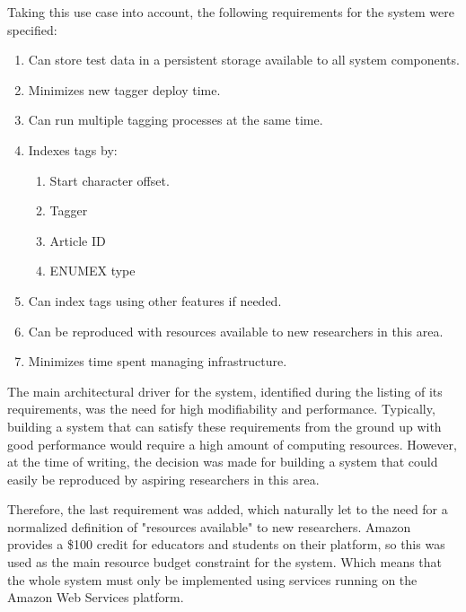 Taking this use case into account, the following requirements for the system were specified:
\begin{enumerate}
\item Can store test data in a persistent storage available to all system components.
\item Minimizes new tagger deploy time.
\item Can run multiple tagging processes at the same time.
\item Indexes tags by:
  \begin{enumerate}
  \item Start character offset.
  \item Tagger
  \item Article ID
  \item ENUMEX type
  \end{enumerate}
\item Can index tags using other features if needed.
\item Can be reproduced with resources available to new researchers in this area.
\item Minimizes time spent managing infrastructure.
\end{enumerate}

The main architectural driver for the system, identified during the listing of its requirements, was the need for high modifiability and performance.
Typically, building a system that can satisfy these requirements from the ground up with good performance would require a high amount of computing resources. 
However, at the time of writing, the decision was made for building a system that could easily be reproduced by aspiring researchers in this area.

Therefore, the last requirement was added, which naturally let to the need for a normalized definition of "resources available" to new researchers.
Amazon provides a \$100 credit for educators and students on their platform, so this was used as the main resource budget constraint for the system.
Which means that the whole system must only be implemented using services running on the Amazon Web Services platform.

